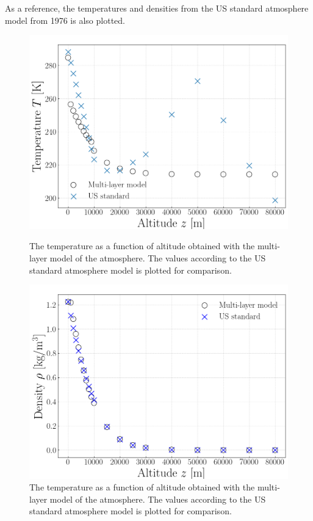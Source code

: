 \documentclass[twocolumn]{article}
\begin{document}
\begin{large}
As a reference, the temperatures and densities from the US standard atmosphere model from 1976 is also plotted. 
\begin{figure}[!t]
    \begin{center}
        \includegraphics[scale=0.35]{Temperature.png}
    \end{center}
    \caption{The temperature as a function of altitude obtained with the multi-layer model of the atmosphere. The values according to the US standard atmosphere model is plotted for comparison.}
    \label{9maj2055}
    \begin{center}
        \includegraphics[scale=0.35]{Density.png}
    \end{center}
    \caption{The temperature as a function of altitude obtained with the multi-layer model of the atmosphere. The values according to the US standard atmosphere model is plotted for comparison.}

\end{figure}
\end{large}
\end{document}
